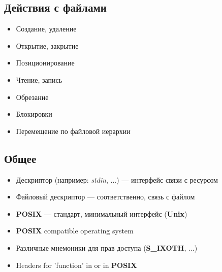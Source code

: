 \documentclass[../../lectures.tex]{subfiles}
\begin{document}
\subsection{Действия с файлами}
\begin{itemize}
    \item Создание, удаление
    \item Открытие, закрытие
    \item Позиционирование
    \item Чтение, запись
    \item Обрезание
    \item Блокировки
    \item Перемещение по файловой иерархии
\end{itemize}

\subsection{Общее}
\begin{itemize}
    \item Дескриптор (например: \emph{stdin}, ...) --- интерфейс связи с ресурсом
    \item Файловый дескриптор --- соответственно, связь с файлом
    \item \textbf{POSIX} --- стандарт, минимальный интерфейс (\textbf{Unix})
    \item \textbf{POSIX} compatible operating system
    \item Различные мнемоники для прав доступа (\textbf{S\_IXOTH}, ...)
    \item Headers for 'function' in  or in \textbf{POSIX}
\end{itemize}
\end{document}
